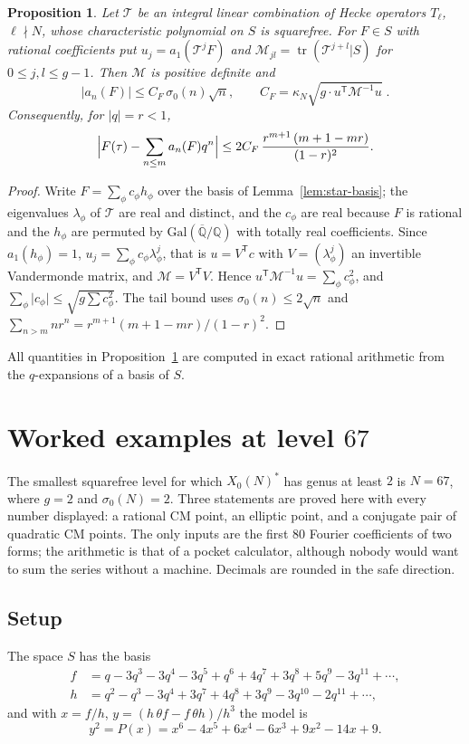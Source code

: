 \documentclass[11pt]{amsart}
\newtheorem{proposition}[theorem]{Proposition}
\theoremstyle{definition}
\theoremstyle{remark}
\newcommand{\Q}{\mathbb{Q}}
\newcommand{\Qbar}{\overline{\Q}}
\newcommand{\sz}{\sigma_0}
\newcommand{\Xs}{X_0(N)^*}
\begin{document}
\begin{proposition}\label{prop:tail}
Let $\mathcal T$ be an integral linear combination of Hecke operators $T_\ell$,
$\ell\nmid N$, whose characteristic polynomial on $S$ is squarefree.  For
$F\in S$ with rational coefficients put $u_j=a_1(\mathcal T^jF)$ and
$\mathcal M_{jl}=\operatorname{tr}(\mathcal T^{j+l}|S)$ for $0\le j,l\le g-1$.
Then $\mathcal M$ is positive definite and
\[
\lvert a_n(F)\rvert\le C_F\,\sz(n)\sqrt n,\qquad
C_F=\kappa_N\sqrt{g\cdot u^{\mathsf T}\mathcal M^{-1}u}\;.
\]
Consequently, for $\lvert q\rvert=r<1$,
\[
\Bigl\lvert F(\tau)-\sum_{n\le m}a_n(F)q^n\Bigr\rvert
\le2C_F\,\frac{r^{m+1}\,(m+1-mr)}{(1-r)^2}.
\]
\end{proposition}
\begin{proof}
Write $F=\sum_\phi c_\phi h_\phi$ over the basis of Lemma~\ref{lem:star-basis};
the eigenvalues $\lambda_\phi$ of $\mathcal T$ are real and distinct, and the
$c_\phi$ are real because $F$ is rational and the $h_\phi$ are permuted by
$\mathrm{Gal}(\Qbar/\Q)$ with totally real coefficients.  Since $a_1(h_\phi)=1$,
$u_j=\sum_\phi c_\phi\lambda_\phi^j$, that is $u=V^{\mathsf T}c$ with
$V=(\lambda_\phi^j)$ an invertible Vandermonde matrix, and
$\mathcal M=V^{\mathsf T}V$.  Hence
$u^{\mathsf T}\mathcal M^{-1}u=\sum_\phi c_\phi^2$, and
$\sum_\phi\lvert c_\phi\rvert\le\sqrt{g\sum c_\phi^2}$.  The tail bound uses
$\sz(n)\le2\sqrt n$ and $\sum_{n>m}nr^n=r^{m+1}(m+1-mr)/(1-r)^2$.
\end{proof}

All quantities in Proposition~\ref{prop:tail} are computed in exact rational
arithmetic from the $q$-expansions of a basis of $S$.

\section{Worked examples at level \texorpdfstring{$67$}{67}}\label{sec:ex}

The smallest squarefree level for which $\Xs$ has genus at least $2$ is $N=67$,
where $g=2$ and $\sz(N)=2$.  Three statements are proved here with every number
displayed: a rational CM point, an elliptic point, and a conjugate pair of
quadratic CM points.  The only inputs are the first $80$ Fourier coefficients of
two forms; the arithmetic is that of a pocket calculator, although nobody would
want to sum the series without a machine.  Decimals are rounded in the safe
direction.

\subsection*{Setup}
The space $S$ has the basis
\begin{align*}
f&=q-3q^3-3q^4-3q^5+q^6+4q^7+3q^8+5q^9-3q^{11}+\cdots,\\
h&=q^2-q^3-3q^4+3q^7+4q^8+3q^9-3q^{10}-2q^{11}+\cdots,
\end{align*}
and with $x=f/h$, $y=(h\,\theta f-f\,\theta h)/h^3$ the model is
\[
y^2=P(x)=x^6-4x^5+6x^4-6x^3+9x^2-14x+9 .
\]
\end{document}
